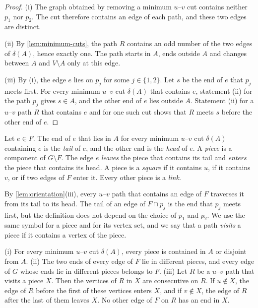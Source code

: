 \begin{proof}
(i) The graph obtained by removing a minimum $u$--$v$ cut contains neither $p_1$ nor $p_2$.
The cut therefore contains an edge of each path, and these two edges are distinct.

(ii) By \cref{lem:minimum-cuts}, the path $R$ contains an odd number of the two edges of $\delta(A)$, hence exactly one.
The path starts in $A$, ends outside $A$ and changes between $A$ and $V \setminus A$ only at this edge.

(iii) By (i), the edge $e$ lies on $p_j$ for some $j \in \{1, 2\}$.
Let $s$ be the end of $e$ that $p_j$ meets first.
For every minimum $u$--$v$ cut $\delta(A)$ that contains $e$, statement (ii) for the path $p_j$ gives $s \in A$, and the other end of $e$ lies outside $A$.
Statement (ii) for a $u$--$v$ path $R$ that contains $e$ and for one such cut shows that $R$ meets $s$ before the other end of $e$.
\end{proof}

\begin{definition}
\label{def:pieces}
Let $e \in F$.
The end of $e$ that lies in $A$ for every minimum $u$--$v$ cut $\delta(A)$ containing $e$ is the \emph{tail} of $e$, and the other end is the \emph{head} of $e$.
A \emph{piece} is a component of $G \setminus F$.
The edge $e$ \emph{leaves} the piece that contains its tail and \emph{enters} the piece that contains its head.
A piece is a \emph{square} if it contains $u$, if it contains $v$, or if two edges of $F$ enter it.
Every other piece is a \emph{link}.
\end{definition}

By \cref{lem:orientation}(iii), every $u$--$v$ path that contains an edge of $F$ traverses it from its tail to its head.
The tail of an edge of $F \cap p_j$ is the end that $p_j$ meets first, but the definition does not depend on the choice of $p_1$ and $p_2$.
We use the same symbol for a piece and for its vertex set, and we say that a path \emph{visits} a piece if it contains a vertex of the piece.

\begin{lemma}
\label{lem:pieces}
(i) For every minimum $u$--$v$ cut $\delta(A)$, every piece is contained in $A$ or disjoint from $A$.
(ii) The two ends of every edge of $F$ lie in different pieces, and every edge of $G$ whose ends lie in different pieces belongs to $F$.
(iii) Let $R$ be a $u$--$v$ path that visits a piece $X$.
Then the vertices of $R$ in $X$ are consecutive on $R$.
If $u \notin X$, the edge of $R$ before the first of these vertices enters $X$, and if $v \notin X$, the edge of $R$ after the last of them leaves $X$.
No other edge of $F$ on $R$ has an end in $X$.
\end{lemma}

